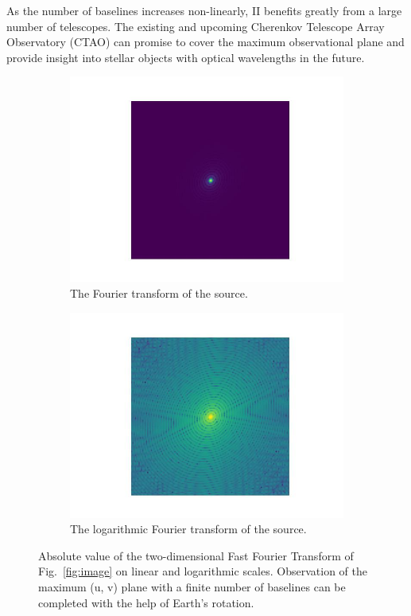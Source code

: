 As the number of baselines increases non-linearly, II benefits greatly from a large number of telescopes. The existing and upcoming Cherenkov Telescope Array Observatory (CTAO) can promise to cover the maximum observational plane and provide insight into stellar objects with optical wavelengths in the future.
\begin{figure}
	\centering
	\begin{subfigure}{\linewidth}
		\includegraphics[width=\linewidth]{fig/ft/ft.jpg}
		\caption{The Fourier transform of the source.}
	\end{subfigure}\hfill
	\begin{subfigure}{\linewidth}
		\includegraphics[width=\linewidth]{fig/ft/ft_log.jpg}
		\caption{The logarithmic Fourier transform of the source.}
	\end{subfigure}
	\caption{Absolute value of the two-dimensional Fast Fourier Transform of Fig.~\ref{fig:image} on linear and logarithmic scales. Observation of the maximum (u, v) plane with a finite number of baselines can be completed with the help of Earth's rotation.}
	\label{fig:ft}
\end{figure}
